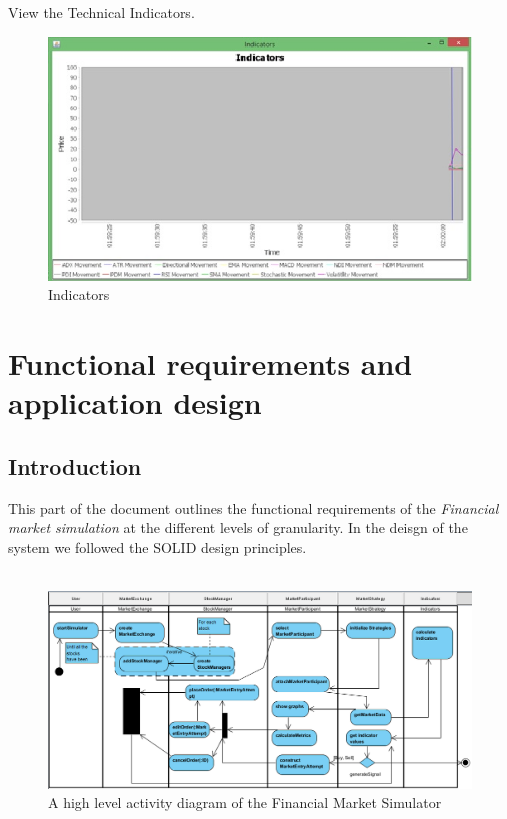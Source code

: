 \documentclass[12pt]{article}
\begin{document}
        View the Technical Indicators.

	\begin{figure}[h!]
	\centering
	\includegraphics[scale=0.8]{indicators}
	\caption{Indicators}
	\label{Indicators}
	\end{figure}
            
\newpage
	\section{Functional requirements and application design}
		\subsection{Introduction}	
		This part of the document outlines the functional requirements of the \textit{Financial market simulation} at the different levels of granularity. In the deisgn of the system we followed the SOLID design principles.\\ \\ 
		
			\begin{figure}[th]
			\centering
			\includegraphics[scale=0.6]{activity}
			\caption{A high level activity diagram of the Financial Market Simulator}
			\label{domain objects}
			\end{figure}
		\pagebreak			    
\end{document}
